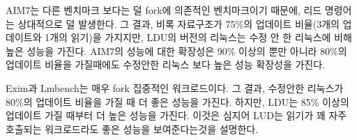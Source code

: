AIM7는 다른 벤치마크 보다는 덜 fork에 의존적인 벤치마크이기 때문에, 리드 명령어는 상대적으로 
덜 발생한다. 
그 결과, 비록 자료구조가 75\%의 업데이트 비율(3개의 업데이트와 1개의 읽기)을 가지지만, 
LDU의 버전의 리눅스는 수정 안 한 리눅스에 비해 높은 성능을 가진다. 
AIM7의 성능에 대한 확장성은 90\% 이상의 뿐만 아니라 80\%의 업데이트 비율을 가질때에도 수정안한 
리눅스 보다 높은 성능 확장성을 가진다.  

Exim과 Lmbench는 매우 fork 집중적인 워크로드이다. 
그 결과, 수정안한 리눅스가 80\%의 업데이트 비율을 가질 때 더 좋은 성능을 가진다.
하지만, LDU는 85\% 이상의 업데이트 가질 때부터 더 높은 성능을 가진다.
이것은 심지어 LUD는 읽기가 꽤 자주 호출되는 워크로드라도 좋은 성능을 보여준다는것을 설명한다. 
 

